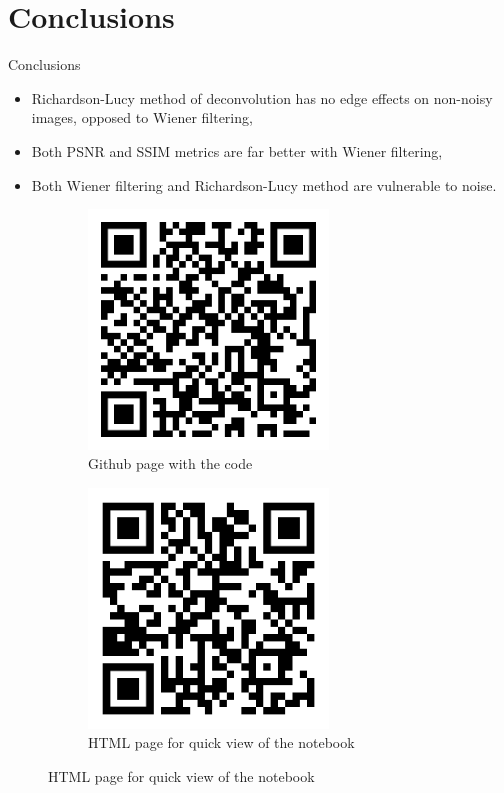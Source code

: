 \documentclass[aspectratio=1610]{beamer}
\begin{document}
\section{Conclusions}
\begin{frame}{Conclusions}
  \begin{itemize}
      \item Richardson-Lucy method of deconvolution has no
      edge effects on non-noisy images, opposed to Wiener filtering,
      \item Both PSNR and SSIM metrics are far better with Wiener filtering,
      \item Both Wiener filtering and Richardson-Lucy method
      are vulnerable to noise.
  \end{itemize}
  \begin{figure}
    \centering
    \begin{subfigure}[t]{0.4\textwidth}
        \includegraphics[width=0.7\textwidth]{images/github_wiener.png}
        \caption{Github page with the code}
        \label{fig:restored9}
    \end{subfigure}
    \begin{subfigure}[t]{0.4\textwidth}
        \includegraphics[width=0.7\textwidth]{images/notebook_wiener.png}
        \caption{HTML page for quick view of the notebook}
        \label{fig:restored10}
    \end{subfigure}
  \end{figure}
\end{frame}
\end{document}
